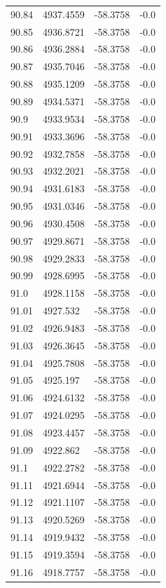 \begin{table}[H]
\begin{tabular}{llll}
90.84 & 4937.4559 & -58.3758 & -0.0 \\
90.85 & 4936.8721 & -58.3758 & -0.0 \\
90.86 & 4936.2884 & -58.3758 & -0.0 \\
90.87 & 4935.7046 & -58.3758 & -0.0 \\
90.88 & 4935.1209 & -58.3758 & -0.0 \\
90.89 & 4934.5371 & -58.3758 & -0.0 \\
90.9 & 4933.9534 & -58.3758 & -0.0 \\
90.91 & 4933.3696 & -58.3758 & -0.0 \\
90.92 & 4932.7858 & -58.3758 & -0.0 \\
90.93 & 4932.2021 & -58.3758 & -0.0 \\
90.94 & 4931.6183 & -58.3758 & -0.0 \\
90.95 & 4931.0346 & -58.3758 & -0.0 \\
90.96 & 4930.4508 & -58.3758 & -0.0 \\
90.97 & 4929.8671 & -58.3758 & -0.0 \\
90.98 & 4929.2833 & -58.3758 & -0.0 \\
90.99 & 4928.6995 & -58.3758 & -0.0 \\
91.0 & 4928.1158 & -58.3758 & -0.0 \\
91.01 & 4927.532 & -58.3758 & -0.0 \\
91.02 & 4926.9483 & -58.3758 & -0.0 \\
91.03 & 4926.3645 & -58.3758 & -0.0 \\
91.04 & 4925.7808 & -58.3758 & -0.0 \\
91.05 & 4925.197 & -58.3758 & -0.0 \\
91.06 & 4924.6132 & -58.3758 & -0.0 \\
91.07 & 4924.0295 & -58.3758 & -0.0 \\
91.08 & 4923.4457 & -58.3758 & -0.0 \\
91.09 & 4922.862 & -58.3758 & -0.0 \\
91.1 & 4922.2782 & -58.3758 & -0.0 \\
91.11 & 4921.6944 & -58.3758 & -0.0 \\
91.12 & 4921.1107 & -58.3758 & -0.0 \\
91.13 & 4920.5269 & -58.3758 & -0.0 \\
91.14 & 4919.9432 & -58.3758 & -0.0 \\
91.15 & 4919.3594 & -58.3758 & -0.0 \\
91.16 & 4918.7757 & -58.3758 & -0.0 \\

\end{tabular}
\end{table}
